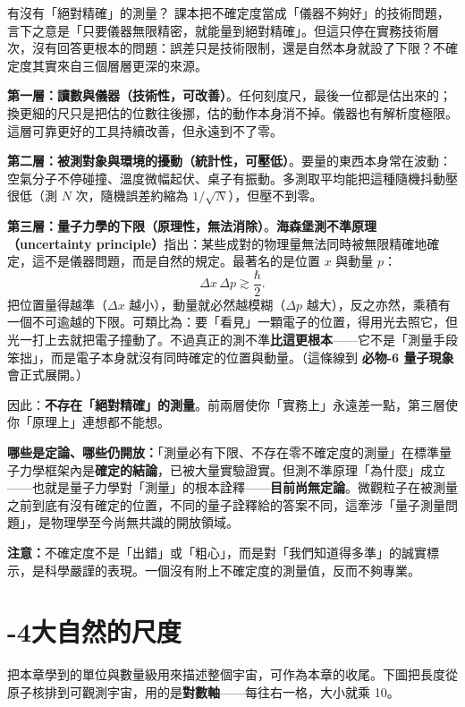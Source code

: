 \documentclass[11pt]{article}
\begin{document}
\begin{延伸框}{有沒有「絕對精確」的測量？}
課本把不確定度當成「儀器不夠好」的技術問題，言下之意是「只要儀器無限精密，就能量到絕對精確」。但這只停在實務技術層次，沒有回答更根本的問題：誤差只是技術限制，還是自然本身就設了下限？不確定度其實來自三個層層更深的來源。

\textbf{第一層：讀數與儀器（技術性，可改善）}。任何刻度尺，最後一位都是估出來的；換更細的尺只是把估的位數往後挪，估的動作本身消不掉。儀器也有解析度極限。這層可靠更好的工具持續改善，但永遠到不了零。

\textbf{第二層：被測對象與環境的擾動（統計性，可壓低）}。要量的東西本身常在波動：空氣分子不停碰撞、溫度微幅起伏、桌子有振動。多測取平均能把這種隨機抖動壓很低（測 $N$ 次，隨機誤差約縮為 $1/\sqrt{N}$），但壓不到零。

\textbf{第三層：量子力學的下限（原理性，無法消除）}。\textbf{海森堡測不準原理（uncertainty principle）}指出：某些成對的物理量無法同時被無限精確地確定，這不是儀器問題，而是自然的規定。最著名的是位置 $x$ 與動量 $p$：
$$\Delta x\,\Delta p \gtrsim \frac{\hbar}{2}.$$
把位置量得越準（$\Delta x$ 越小），動量就必然越模糊（$\Delta p$ 越大），反之亦然，乘積有一個不可逾越的下限。可類比為：要「看見」一顆電子的位置，得用光去照它，但光一打上去就把電子撞動了。不過真正的測不準\textbf{比這更根本}——它不是「測量手段笨拙」，而是電子本身就沒有同時確定的位置與動量。（這條線到 \textbf{必物-6 量子現象} 會正式展開。）

因此：\textbf{不存在「絕對精確」的測量}。前兩層使你「實務上」永遠差一點，第三層使你「原理上」連想都不能想。

\textbf{哪些是定論、哪些仍開放：}「測量必有下限、不存在零不確定度的測量」在標準量子力學框架內是\textbf{確定的結論}，已被大量實驗證實。但測不準原理「為什麼」成立——也就是量子力學對「測量」的根本詮釋——\textbf{目前尚無定論}。微觀粒子在被測量之前到底有沒有確定的位置，不同的量子詮釋給的答案不同，這牽涉「量子測量問題」，是物理學至今尚無共識的開放領域。

\textbf{注意：}不確定度不是「出錯」或「粗心」，而是對「我們知道得多準」的誠實標示，是科學嚴謹的表現。一個沒有附上不確定度的測量值，反而不夠專業。
\end{延伸框}

\section*{-4\quad 大自然的尺度}

把本章學到的單位與數量級用來描述整個宇宙，可作為本章的收尾。下圖把長度從原子核排到可觀測宇宙，用的是\textbf{對數軸}——每往右一格，大小就乘 10。
\end{document}
